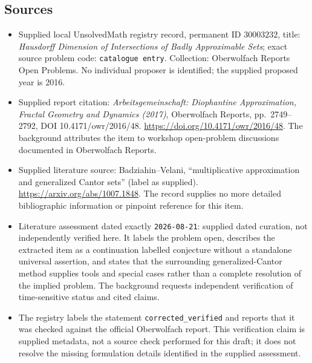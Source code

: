 \documentclass[11pt]{article}
\begin{document}
\subsection{Sources}
\begin{itemize}
\item Supplied local UnsolvedMath registry record, permanent ID \(30003232\), title: \emph{Hausdorff Dimension of Intersections of Badly Approximable Sets}; exact source problem code: \texttt{catalogue entry}. Collection: Oberwolfach Reports Open Problems. No individual proposer is identified; the supplied proposed year is 2016.
\item Supplied report citation: \emph{Arbeitsgemeinschaft: Diophantine Approximation, Fractal Geometry and Dynamics (2017)}, Oberwolfach Reports, pp.\ 2749--2792, DOI 10.4171/owr/2016/48. \url{https://doi.org/10.4171/owr/2016/48}. The background attributes the item to workshop open-problem discussions documented in Oberwolfach Reports.
\item Supplied literature source: Badziahin--Velani, ``multiplicative approximation and generalized Cantor sets'' (label as supplied). \url{https://arxiv.org/abs/1007.1848}. The record supplies no more detailed bibliographic information or pinpoint reference for this item.
\item Literature assessment dated exactly \texttt{2026-08-21}: supplied dated curation, not independently verified here. It labels the problem open, describes the extracted item as a continuation labelled conjecture without a standalone universal assertion, and states that the surrounding generalized-Cantor method supplies tools and special cases rather than a complete resolution of the implied problem. The background requests independent verification of time-sensitive status and cited claims.
\item The registry labels the statement \texttt{corrected\_verified} and reports that it was checked against the official Oberwolfach report. This verification claim is supplied metadata, not a source check performed for this draft; it does not resolve the missing formulation details identified in the supplied assessment.
\end{itemize}
\end{document}
